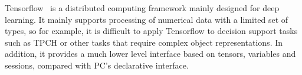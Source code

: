 Tensorflow~\cite{abadi2016tensorflow} is a
distributed computing framework mainly designed for deep learning. It
mainly supports processing of numerical data with a
limited set of types, so for example,  it is
difficult to apply Tensorflow to decision support tasks such as
TPCH or other tasks that require complex object representations. In
addition, it provides a much lower level interface based on tensors,
variables and sessions, compared with PC's
declarative interface. 



